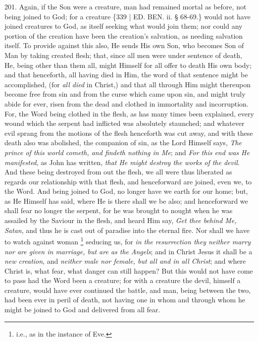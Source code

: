 201. Again, if the Son were a
creature, man had remained mortal as before, not being joined to God;
for a creature \{339 | ED.
BEN. ii. § 68-69.\} would not have joined
creatures to God, as itself seeking what would join them; nor could
any portion of the creation have been the creation's salvation, as
needing salvation itself. To provide against this also, He sends His
own Son, who becomes Son of Man by taking created flesh; that, since
all men were under sentence of death, He, being other than them all,
might Himself for all offer to death His own body; and that
henceforth, all having died in Him, the word of that sentence might be
accomplished, (for \emph{all died} in Christ,) and that all through
Him might thereupon become free from sin and from the curse which came
upon sin, and might truly abide for ever, risen from the dead and
clothed in immortality and incorruption. For, the Word being clothed
in the flesh, as has many times been explained, every wound which the
serpent had inflicted was absolutely staunched; and whatever evil
sprang from the motions of the flesh henceforth was cut away, and with
these death also was abolished, the companion of sin, as the Lord
Himself says, \emph{The prince of this world cometh, and findeth nothing
in Me}; and \emph{For this end was He manifested}, as John has
written, \emph{that He might destroy the works of the devil}. And
these being destroyed from out the flesh, we all were thus liberated
as regards our relationship with that flesh, and henceforward are
joined, even we, to the Word. And being joined to God, no longer have
we earth for our home; but, as He Himself has said, where He is there
shall we be also; and henceforward we shall fear no longer the
serpent, for he was brought to nought when he was assailed by the
Saviour in the flesh, and heard Him say, \emph{Get thee behind Me, Satan},
and thus he is cast out of paradise into the eternal fire. Nor shall
we have to watch against woman \footnote{i.e., as in the instance of Eve.}
seducing us, for \emph{in the resurrection they neither marry nor are
given in marriage, but are as the} \emph{Angels}; and in
Christ Jesus it shall be a \emph{new creation}, and \emph{neither male
nor female, but all and in all Christ}; and where Christ is, what
fear, what danger can still happen? But this would not have come to
pass had the Word been a creature; for with a creature the devil,
himself a creature, would have ever continued the battle, and man,
being between the two, had been ever in peril of death, not having one
in whom and through whom he might be joined to God and delivered from
all fear.

